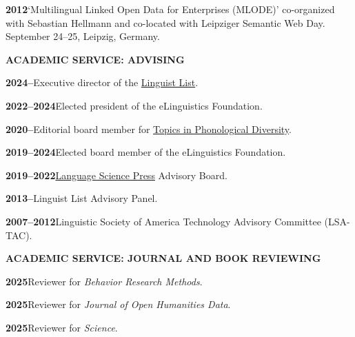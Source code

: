 \documentclass[11pt]{article}
\newcommand{\hangpara}{
 \setlength{\parindent}{0in} %
 \hangindent=0.42in %
}
\begin{document}
\vskip 6pt
\hangpara
{\bf 2012}\hspace{1ex}`Multilingual Linked Open Data for Enterprises (MLODE)' co-organized with Sebastian Hellmann and co-located with Leipziger Semantic Web Day. September 24--25, Leipzig, Germany.


\vskip 20pt
\begin{flushleft}
{\bf ACADEMIC SERVICE: ADVISING}
\end{flushleft}

\hangpara
{\bf 2024--}\hspace{1ex}Executive director of the \href{https://linguistlist.org}{Linguist List}.

\vskip 6pt
\hangpara
{\bf 2022--2024}\hspace{1ex}Elected president of the eLinguistics Foundation.

\vskip 6pt
\hangpara
{\bf 2020--}\hspace{1ex}Editorial board member for \href{https://langsci-press.org/catalog/series/tpd}{Topics in Phonological Diversity}.

\vskip 6pt
\hangpara
{\bf 2019--2024}\hspace{1ex}Elected board member of the eLinguistics Foundation.

\vskip 6pt
\hangpara
{\bf 2019--2022}\hspace{1ex}\href{https://langsci-press.org/}{Language Science Press} Advisory Board.

\vskip 6pt
\hangpara
{\bf 2013--}\hspace{1ex}Linguist List Advisory Panel.

\vskip 6pt
\hangpara
{\bf 2007--2012}\hspace{1ex}Linguistic Society of America Technology Advisory Committee (LSA-TAC).

\vskip 20pt
\begin{flushleft}
{\bf ACADEMIC SERVICE: JOURNAL AND BOOK REVIEWING}
\end{flushleft}


\hangpara
{\bf 2025}\hspace{1ex}Reviewer for \textit{Behavior Research Methods}.

\vskip 6pt
\hangpara
{\bf 2025}\hspace{1ex}Reviewer for \textit{Journal of Open Humanities Data}.

\vskip 6pt
\hangpara
{\bf 2025}\hspace{1ex}Reviewer for \textit{Science}.
\end{document}
